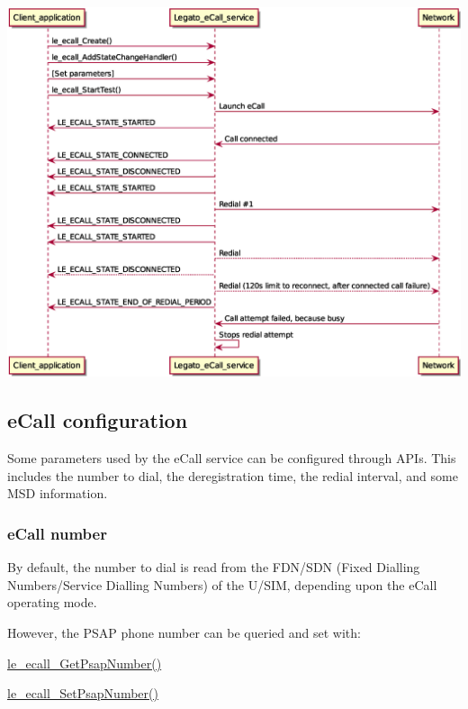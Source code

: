 \begin{DoxyImageNoCaption}
  \mbox{\includegraphics[width=\textwidth,height=\textheight/2,keepaspectratio=true]{PanEU_eCallConnects_thenFails}}
\end{DoxyImageNoCaption}
\hypertarget{c_SDD_eCall_le_ecall_configuration}{}\subsection{e\+Call configuration}\label{c_SDD_eCall_le_ecall_configuration}
Some parameters used by the e\+Call service can be configured through A\+P\+Is. This includes the number to dial, the deregistration time, the redial interval, and some M\+SD information.\hypertarget{c_SDD_eCall_le_ecall_configuration_callNumber}{}\subsubsection{e\+Call number}\label{c_SDD_eCall_le_ecall_configuration_callNumber}
By default, the number to dial is read from the F\+D\+N/\+S\+DN (Fixed Dialling Numbers/\+Service Dialling Numbers) of the U/\+S\+IM, depending upon the e\+Call operating mode.

However, the P\+S\+AP phone number can be queried and set with\+:
\begin{DoxyItemize}
\item \hyperlink{le__ecall__interface_8h_a959c53f03bb85f1071fcf7cb58e3067e}{le\+\_\+ecall\+\_\+\+Get\+Psap\+Number()}
\item \hyperlink{le__ecall__interface_8h_abf9c09914c55cdbe72df1433f60f6e51}{le\+\_\+ecall\+\_\+\+Set\+Psap\+Number()}
\end{DoxyItemize}

